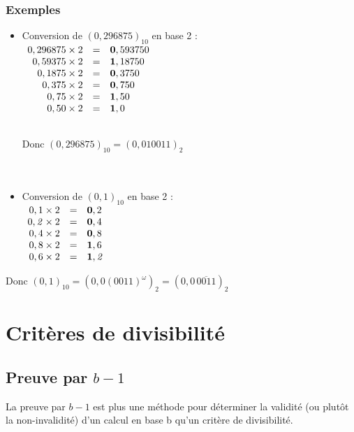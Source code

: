 \documentclass[a4paper,10pt]{book}
\begin{document}
\subsubsection{Exemples}
\begin{itemize}\renewcommand{\labelitemi}{$\bullet$} \item Conversion de $(0,296875)_{10}$ en base 2 :\\

$\begin{array}{rcl}
0,296875\times 2&=&\text{\textbf{0}},593750\\
0,59375\times 2&=&\text{\textbf{1}},18750\\
0,1875\times 2&=&\text{\textbf{0}},3750\\
0,375\times 2&=&\text{\textbf{0}},750\\
0,75\times 2&=&\text{\textbf{1}},50\\
0,50\times 2&=&\text{\textbf{1}},0\\\\
\end{array}$

Donc $(0,296875)_{10}=(0,010011)_{2}$\\\\\\

\item Conversion de $(0,1)_{10}$ en base 2 :\\

$\begin{array}{rcl}
0,1\times 2&=&\text{\textbf{0}},2\\
0,\text{\textit{2}}\times 2&=&\text{\textbf{0}},4\\
0,4\times 2&=&\text{\textbf{0}},8\\
0,8\times 2&=&\text{\textbf{1}},6\\
0,6\times 2&=&\text{\textbf{1}},\text{\textit{2}}\\
\end{array}$ \end{itemize}

Donc $(0,1)_{10}=(0,0(0011)^{\omega})_{2}=(0,0\, \overline{0011})_{2}$

\section{Critères de divisibilité}
\subsection{Preuve par $b-1$}
La preuve par $b-1$ est plus une méthode pour déterminer la validité (ou plutôt la non-invalidité) d'un calcul en base b qu'un critère de divisibilité.\\
\end{document}
